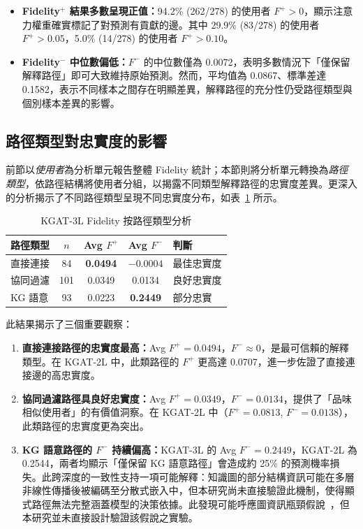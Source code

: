 \begin{itemize}[leftmargin=2em]
  \item \textbf{Fidelity$^+$ 結果多數呈現正值：}94.2\% (262/278) 的使用者 $F^+ > 0$，顯示注意力權重確實標記了對預測有貢獻的邊。其中 29.9\% (83/278) 的使用者 $F^+ > 0.05$，5.0\% (14/278) 的使用者 $F^+ > 0.10$。
  \item \textbf{Fidelity$^-$ 中位數偏低：}$F^-$ 的中位數僅為 0.0072，表明多數情況下「僅保留解釋路徑」即可大致維持原始預測。然而，平均值為 0.0867、標準差達 0.1582，表示不同樣本之間存在明顯差異，解釋路徑的充分性仍受路徑類型與個別樣本差異的影響。
\end{itemize}

\subsection{路徑類型對忠實度的影響}

前節以\emph{使用者}為分析單元報告整體 Fidelity 統計；本節則將分析單元轉換為\emph{路徑類型}，依路徑結構將使用者分組，以揭露不同類型解釋路徑的忠實度差異。更深入的分析揭示了不同路徑類型呈現不同忠實度分布，如表~\ref{tab:fidelity_by_type} 所示。

\begin{table}[htbp]
  \centering
  \caption{KGAT-3L Fidelity 按路徑類型分析}
  \label{tab:fidelity_by_type}
  \begin{tabular}{l c cc l}
    \toprule
    路徑類型 & $n$ & Avg $F^+$ & Avg $F^-$ & 判斷 \\
    \midrule
    直接連接 & 84 & \textbf{0.0494} & $\bm{-0.0004}$ & 最佳忠實度 \\
    協同過濾 & 101 & 0.0349 & 0.0134 & 良好忠實度 \\
    KG 語意  & 93 & 0.0223 & \textbf{0.2449} & 部分忠實 \\
    \bottomrule
  \end{tabular}
\end{table}

此結果揭示了三個重要觀察：

\begin{enumerate}[leftmargin=2em]
  \item \textbf{直接連接路徑的忠實度最高：}Avg $F^+ = 0.0494$，$F^- \approx 0$，是最可信賴的解釋類型。在 KGAT-2L 中，此類路徑的 $F^+$ 更高達 0.0707，進一步佐證了直接連接邊的高忠實度。
  \item \textbf{協同過濾路徑具良好忠實度：}Avg $F^+ = 0.0349$，$F^- = 0.0134$，提供了「品味相似使用者」的有價值洞察。在 KGAT-2L 中（$F^+ = 0.0813$, $F^- = 0.0138$），此類路徑的忠實度更為突出。
  \item \textbf{KG 語意路徑的 $F^-$ 持續偏高：}KGAT-3L 的 Avg $F^- = 0.2449$，KGAT-2L 為 0.2544，兩者均顯示「僅保留 KG 語意路徑」會造成約 25\% 的預測機率損失。此跨深度的一致性支持一項可能解釋：知識圖的部分結構資訊可能在多層非線性傳播後被編碼至分散式嵌入中，但本研究尚未直接驗證此機制，使得顯式路徑無法完整涵蓋模型的決策依據。此發現可能呼應圖資訊瓶頸假說~\cite{wu2020gib}，但本研究並未直接設計驗證該假說之實驗。
\end{enumerate}

